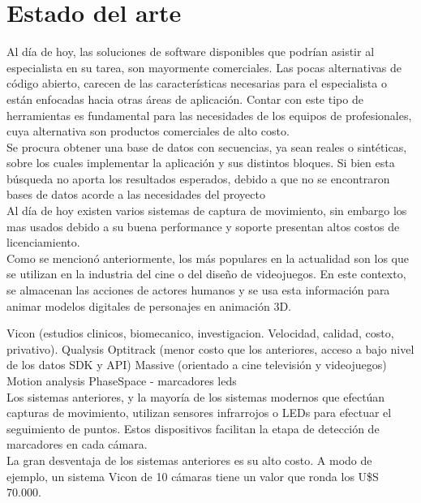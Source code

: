 \section{Estado del arte}\label{estadoDelArte}


Al  día  de  hoy, las  soluciones  de  software  disponibles que  podrían  asistir al especialista en su tarea, son mayormente comerciales. Las pocas alternativas de código abierto, carecen de las características necesarias para el especialista o están enfocadas hacia otras áreas de aplicación. Contar con este tipo de herramientas es fundamental para las necesidades de los equipos de profesionales, cuya alternativa son productos comerciales de alto costo.\\


Se procura obtener una base de datos con secuencias, ya sean reales o sintéticas, sobre los cuales implementar la aplicación y sus distintos bloques. Si bien esta búsqueda no aporta los resultados esperados,
 debido a que no se encontraron bases de datos acorde a las necesidades del proyecto\\
 
 Al día de hoy existen varios sistemas de captura de movimiento, sin embargo los mas usados debido a su buena performance y soporte presentan altos costos de licenciamiento. 
\\ 

Como se mencionó anteriormente, los más populares en la actualidad son los que se utilizan en la industria del cine o del diseño de videojuegos. En este contexto, se almacenan las acciones de actores humanos y se usa esta información para animar modelos digitales de personajes en animación 3D.

Vicon (estudios clinicos, biomecanico, investigacion. Velocidad, calidad, costo, privativo).
Qualysis
Optitrack (menor costo que los anteriores, acceso a bajo nivel de los datos SDK y API)
Massive (orientado a cine televisión y videojuegos)
Motion analysis
PhaseSpace - marcadores leds
\\ 

Los sistemas anteriores, y la mayoría de los sistemas modernos que efectúan
capturas de movimiento, utilizan sensores infrarrojos o LEDs para efectuar el seguimiento
de puntos. Estos dispositivos facilitan la etapa de detección de marcadores
en cada cámara.\\

La gran desventaja de los sistemas anteriores es su alto costo. A modo de ejemplo,
un sistema Vicon de 10 cámaras tiene un valor que ronda los U\$S 70.000.\\

